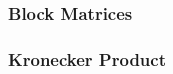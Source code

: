 \subsubsection{Block Matrices}

\subsubsection{Kronecker Product}


\begin{comment}
	
Dear linear algebra students, This is what matrices (and matrix manipulation) really look like	
https://www.youtube.com/watch?v=4csuTO7UTMo	

Interpretation of matrices:

-in the context of solving linear systems of equations
 -each row gives a left-hand-side of one equation the system
 -each row defines a hyperplane, the solution of the system is the point where all
  hyperplanes intersect
 -each column represents a vector and we are looking for the coeffs to scale the 
  cols by to obtain agiven target vector on the RHS

-In the context of linear transformations:
 -the j-th column tells us where the j-th unit basis vector is mapped to
 
Maybe have sections for
-Product Decompositions

	
\end{comment}